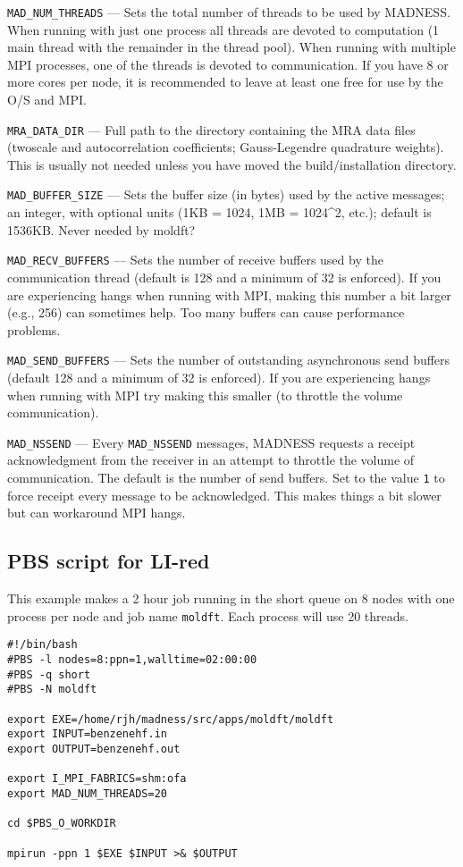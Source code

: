 \documentclass[letterpaper]{book}
\begin{document}
\verb+MAD_NUM_THREADS+ --- Sets the total number of threads to be used
by MADNESS.  When running with just one process all threads are
devoted to computation (1 main thread with the remainder in the thread
pool).  When running with multiple MPI processes, one of the threads
is devoted to communication.  If you have 8 or more cores per node, it
is recommended to leave at least one free for use by the O/S and MPI.

\verb+MRA_DATA_DIR+ --- Full path to the directory containing the MRA
data files (twoscale and autocorrelation coefficients; Gauss-Legendre
quadrature weights).  This is usually not needed unless you have moved
the build/installation directory.

\verb+MAD_BUFFER_SIZE+ --- Sets the buffer size (in bytes) used by the
active messages; an integer, with optional units (1KB = 1024, 1MB = 1024^2, etc.); default is 1536KB.
Never needed by moldft?

\verb+MAD_RECV_BUFFERS+ --- Sets the number of receive buffers used by
the communication thread (default is 128 and a minimum of 32 is
enforced).  If you are experiencing hangs when running with MPI,
making this number a bit larger (e.g., 256) can sometimes help. Too
many buffers can cause performance problems.

\verb+MAD_SEND_BUFFERS+ --- Sets the number of outstanding
asynchronous send buffers (default 128 and a minimum of 32 is
enforced).  If you are experiencing hangs when running with MPI try
making this smaller (to throttle the volume communication).

\verb+MAD_NSSEND+ --- Every \verb+MAD_NSSEND+ messages, MADNESS
requests a receipt acknowledgment from the receiver in an attempt to
throttle the volume of communication.  The default is the number of
send buffers.  Set to the value \verb+1+ to force receipt every
message to be acknowledged.  This makes things a bit slower but can
workaround MPI hangs.

\subsection{PBS script for LI-red}
\label{sec:pbslired}

This example makes a 2 hour job running in the short queue on 8 nodes
with one process per node and job name {\tt moldft}.  Each process
will use 20 threads.

\begin{verbatim}
#!/bin/bash                                                                     
#PBS -l nodes=8:ppn=1,walltime=02:00:00                                         
#PBS -q short                                                                   
#PBS -N moldft                                                                  

export EXE=/home/rjh/madness/src/apps/moldft/moldft
export INPUT=benzenehf.in
export OUTPUT=benzenehf.out

export I_MPI_FABRICS=shm:ofa
export MAD_NUM_THREADS=20

cd $PBS_O_WORKDIR

mpirun -ppn 1 $EXE $INPUT >& $OUTPUT
\end{verbatim}
\end{document}
